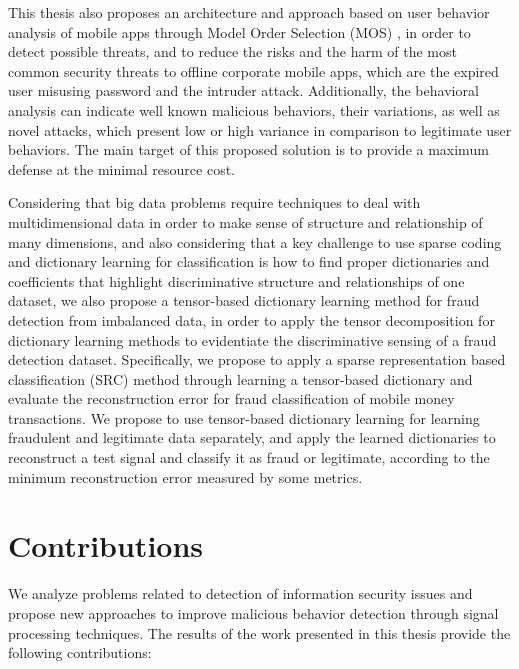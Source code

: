 This thesis also proposes an architecture and approach based on user behavior analysis of mobile apps through Model Order Selection (MOS) \cite{tenorio2013greatest}, in order to detect possible threats, and to reduce the risks and the harm of the most common security threats to offline corporate mobile apps, which are the expired user misusing password and the intruder attack. Additionally, the behavioral analysis can indicate well known malicious behaviors, their variations, as well as novel attacks, which present low or high variance in comparison to legitimate user behaviors. The main target of this proposed solution is to provide a maximum defense at the minimal resource cost.

Considering that big data problems require techniques to deal with multidimensional data in order to make sense of structure and relationship of many dimensions, and also considering that a key challenge to use sparse coding and dictionary learning for classification is how to find proper dictionaries and coefficients that highlight discriminative structure and relationships of one dataset, we also propose a tensor-based dictionary learning method for fraud detection from imbalanced data, in order to apply the tensor decomposition for dictionary learning methods to evidentiate the discriminative sensing of a fraud detection dataset. Specifically, we propose to apply a sparse representation based classification (SRC) method through learning a tensor-based dictionary and evaluate the reconstruction error for fraud classification of mobile money transactions. We propose to use tensor-based dictionary learning for learning fraudulent and legitimate data separately, and apply the learned dictionaries to reconstruct a test signal and classify it as fraud or legitimate, according to the minimum reconstruction error measured by some metrics.


\section{Contributions}
\label{sc:contributions}

We analyze problems related to detection of information security issues and propose new approaches to improve malicious behavior detection through signal processing techniques. The results of the work presented in this thesis provide the following contributions:

